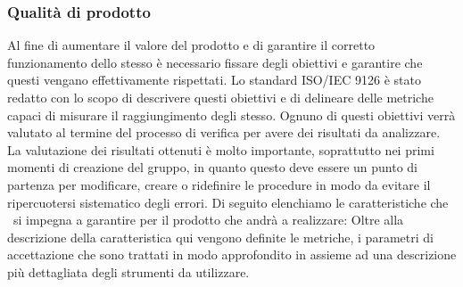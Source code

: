 \subsubsection{Qualità di prodotto}
Al fine di aumentare il valore del prodotto e di garantire il corretto funzionamento dello stesso è necessario fissare degli obiettivi e garantire che questi vengano effettivamente rispettati.
Lo standard ISO/IEC 9126 è stato redatto con lo scopo di descrivere questi obiettivi e di delineare delle metriche capaci di misurare il raggiungimento degli stesso.
Ognuno di questi obiettivi verrà valutato al termine del processo di verifica per avere dei risultati da analizzare. La valutazione dei risultati ottenuti è molto importante, soprattutto nei primi momenti di creazione del gruppo, in quanto questo deve essere un punto di partenza per modificare, creare o ridefinire le procedure in modo da evitare il ripercuotersi sistematico degli errori.
Di seguito elenchiamo le caratteristiche che \gruppo ~si impegna a garantire per il prodotto che andrà a realizzare: Oltre alla descrizione della caratteristica qui vengono definite le metriche, i parametri di accettazione che sono trattati in modo approfondito in \infoNDP assieme ad una descrizione più dettagliata degli strumenti da utilizzare. 
